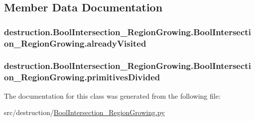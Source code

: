 \subsection{Member Data Documentation}
\hypertarget{classdestruction_1_1_bool_intersection___region_growing_1_1_bool_intersection___region_growing_af6985d0ce9dd0403c9a608408bdfacf8}{
\subsubsection[{already\-Visited}]{\setlength{\rightskip}{0pt plus 5cm}destruction.\-Bool\-Intersection\-\_\-\-Region\-Growing.\-Bool\-Intersection\-\_\-\-Region\-Growing.\-already\-Visited}}\label{classdestruction_1_1_bool_intersection___region_growing_1_1_bool_intersection___region_growing_af6985d0ce9dd0403c9a608408bdfacf8}
\hypertarget{classdestruction_1_1_bool_intersection___region_growing_1_1_bool_intersection___region_growing_ae352e3b42a1b8933e9e52f82ea26628a}{
\subsubsection[{primitives\-Divided}]{\setlength{\rightskip}{0pt plus 5cm}destruction.\-Bool\-Intersection\-\_\-\-Region\-Growing.\-Bool\-Intersection\-\_\-\-Region\-Growing.\-primitives\-Divided}}\label{classdestruction_1_1_bool_intersection___region_growing_1_1_bool_intersection___region_growing_ae352e3b42a1b8933e9e52f82ea26628a}


The documentation for this class was generated from the following file\-:\begin{DoxyCompactItemize}
\item 
src/destruction/\hyperlink{_bool_intersection___region_growing_8py}{Bool\-Intersection\-\_\-\-Region\-Growing.\-py}\end{DoxyCompactItemize}
